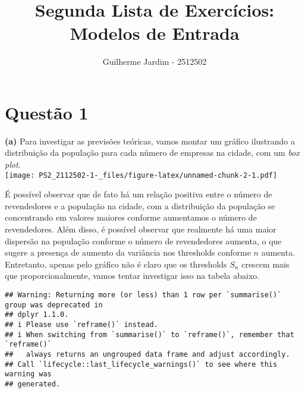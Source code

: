 \documentclass[
  12pt,
]{article}
\title{Segunda Lista de Exercícios:\\
Modelos de Entrada}
\author{Guilherme Jardim - 2512502}
\date{}
\begin{document}
\maketitle

\captionsetup[table]{labelformat=empty}

\hypertarget{questuxe3o-1}{%
\section{Questão 1}\label{questuxe3o-1}}

\textbf{(a)} Para investigar as previsões teóricas, vamos montar um
gráfico ilustrando a distribuição da população para cada número de
empresas na cidade, com um \emph{box plot}.\\
\texttt{[image: PS2\_2112502-1-\_files/figure-latex/unnamed-chunk-2-1.pdf]}

É possível observar que de fato há um relação positiva entre o número de
revendedores e a população na cidade, com a distribuição da população se
concentrando em valores maiores conforme aumentamos o número de
revendedores. Além disso, é possível observar que realmente há uma maior
dispersão na população conforme o número de revendedores aumenta, o que
sugere a presença de aumento da variância nos thresholds conforme \(n\)
aumenta. Entretanto, apenas pelo gráfico não é claro que os thresholds
\(S_n\) crescem mais que proporcionalmente, vamos tentar investigar isso
na tabela abaixo.

\begin{verbatim}
## Warning: Returning more (or less) than 1 row per `summarise()` group was deprecated in
## dplyr 1.1.0.
## i Please use `reframe()` instead.
## i When switching from `summarise()` to `reframe()`, remember that `reframe()`
##   always returns an ungrouped data frame and adjust accordingly.
## Call `lifecycle::last_lifecycle_warnings()` to see where this warning was
## generated.
\end{verbatim}
\end{document}
